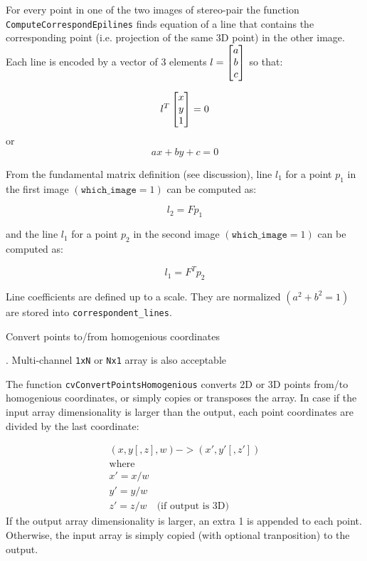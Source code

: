 For every point in one of the two images of stereo-pair the function
\texttt{ComputeCorrespondEpilines} finds equation of a line that
contains the corresponding point (i.e. projection of the same 3D
point) in the other image. Each line is encoded by a vector of 3
elements $l = \begin{bmatrix} a\\ b\\ c \end{bmatrix}$ so that:

\[ l^T \begin{bmatrix} x\\ y\\ 1 \end{bmatrix} = 0 \]
or
\[ a x + b y + c = 0 \]

From the fundamental matrix definition (see 
discussion), line $l_1$ for a point $p_1$ in the first image
$(\texttt{which\_image}=1)$ can be computed as:

\[ l_2 = F p_1 \]

and the line $l_1$ for a point $p_2$ in the second image $(\texttt{which\_image}=1)$ can be computed as:

\[ l_1 = F^T p_2 \]

Line coefficients are defined up to a scale. They are normalized $(a^2+b^2=1)$ are stored into \texttt{correspondent\_lines}.

\label{ConvertPointsHomogenious}

Convert points to/from homogenious coordinates


\begin{description}
. Multi-channel \texttt{1xN} or \texttt{Nx1} array is also acceptable
\end{description}

The function \texttt{cvConvertPointsHomogenious} converts 2D or 3D points from/to homogenious coordinates, or simply copies or transposes the array. In case if the input array dimensionality is larger than the output, each point coordinates are divided by the last coordinate:

\[
\begin{array}{l}
(x,y[,z],w) -> (x',y'[,z'])\\
\text{where} \\
x' = x/w \\
y' = y/w \\
z' = z/w \quad \text{(if output is 3D)}
\end{array}
\]
If the output array dimensionality is larger, an extra 1 is appended to each point.  Otherwise, the input array is simply copied (with optional tranposition) to the output.


